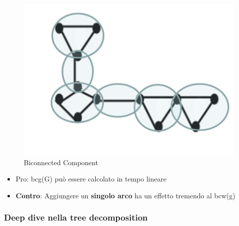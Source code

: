 \begin{figure}
    \centering
    \includegraphics[width=0.7\linewidth]{chapters/images/biconnected.png}
    \caption{Biconnected Component}
    \label{fig:4}
\end{figure}

\begin{itemize}
    \item Pro: bcg(G) può essere calcolato in tempo lineare
    \item \textbf{Contro}: Aggiungere un \textbf{singolo arco} ha un effetto tremendo al bcw(g)
\end{itemize}

\subsubsection{Deep dive nella tree decomposition}

